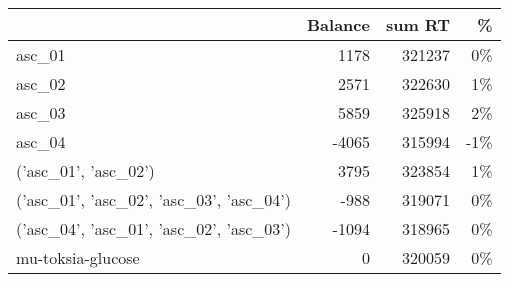 \begin{tabular}{lrrr}
\toprule
 & Balance & sum RT &  \% \\
\midrule
asc_01 & 1178 & 321237 & 0\% \\
asc_02 & 2571 & 322630 & 1\% \\
asc_03 & 5859 & 325918 & 2\% \\
asc_04 & -4065 & 315994 & -1\% \\
('asc_01', 'asc_02') & 3795 & 323854 & 1\% \\
('asc_01', 'asc_02', 'asc_03', 'asc_04') & -988 & 319071 & 0\% \\
('asc_04', 'asc_01', 'asc_02', 'asc_03') & -1094 & 318965 & 0\% \\
mu-toksia-glucose & 0 & 320059 & 0\% \\
\bottomrule
\end{tabular}
